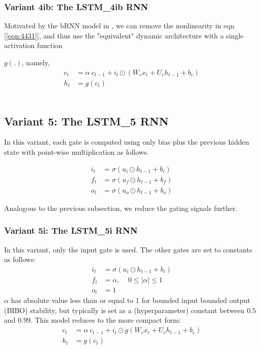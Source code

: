 \documentclass{article}
\begin{document}
\subsubsection{Variant 4ib: The LSTM\_4ib RNN}
Motivated by the bRNN model in \cite {salem2016basic}, we can remove the nonlinearity in eqn [\ref{eqn:4431}], and thus use the "equivalent" dynamic architecture with a single activation function {$g(.)$, namely,
\begin{align}
	\label{eqn:431}	c_t &=  \alpha ~ c_{t-1} + i_t \odot (W_c x_t + U_c h_{t-1} + b_c)\\
	\label{eqn:441}	h_t &=  g(c_t)
\end{align}
\\
\subsection{Variant 5: The LSTM\_5 RNN}
In this variant, each gate is computed using only bias plus the previous hidden state with point-wise multiplication as follows.

\begin{align}
	i_t &= \sigma(u_i \odot  h_{t-1} + b_i)\\
	f_t &= \sigma(u_f \odot h_{t-1} + b_f)\\
	o_t &= \sigma(u_o \odot  h_{t-1} + b_o)
\end{align}

Analogous to the previous subsection, we reduce the gating signals further.

\subsubsection{Variant 5i: The LSTM\_5i RNN}
In this variant, only the input gate is used. The other gates are set to constants as follows:
\begin{align}
	i_t &= \sigma(u_i \odot  h_{t-1} + b_i)\\
	f_t &= \alpha , ~~~~~  0 \leq |\alpha| \leq  1 \\
	o_t &= 1
\end{align}
$\alpha$ has absolute value less than or equal to 1 for bounded input bounded output (BIBO) stability, but typically is set as a (hyperparameter) constant between $0.5$ and $0.99$.
This model reduces to the more compact form:
\begin{align}
	\label{eqn:5531}	c_t &=  \alpha ~ c_{t-1} + i_t \odot g(W_c x_t + U_c h_{t-1} + b_c)\\
	\label{eqn:5541}	h_t &=  g(c_t)
\end{align}

}
\end{document}
